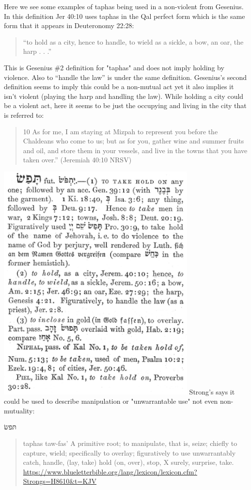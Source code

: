 \documentclass[11pt]{article}
\begin{document}
Here we see some examples of taphas being used in a non-violent from Gesenius. In this definition Jer 40:10 uses taphas in the Qal perfect form which is the same form that it appears in Deuteronomy 22:28:
\begin{quote}
“to hold as a city, hence to handle, to wield as a sickle, a bow, an oar, the harp . . .” 
\end{quote}
This is Gesenius \#2 definition for "taphas" and does not imply holding by violence. Also to “handle the law” is under the same definition. Gesenius’s second definition seems to imply this could be a non-mutual act yet it also implies it isn't violent (playing the harp and handling the law). While holding a city could be a violent act, here it seems to be just the occupying and living in the city that is referred to:
\begin{quote}
10 As for me, I am staying at Mizpah to represent you before the Chaldeans who come to us; but as for you, gather wine and summer fruits and oil, and store them in your vessels, and live in the towns that you have taken over.” (Jeremiah 40:10 NRSV)
\end{quote}

\includegraphics[width=10cm]{taphas}
\newline
Strong’s says it could be used to describe manipulation or "unwarrantable use" not even non-mutuality:

 \begin{hebrew} תּפשׂ  \end{hebrew}
\begin{quote}
taphas \newline
taw-fas' \newline
A primitive root; to manipulate, that is, seize; chiefly to capture, wield; specifically to overlay; figuratively to use unwarrantably
 catch, handle, (lay, take) hold (on, over), stop, X surely, surprise, take. \newline
\url{https://www.blueletterbible.org/lang/lexicon/lexicon.cfm?Strongs=H8610&t=KJV}
\end{quote}
\end{document}
